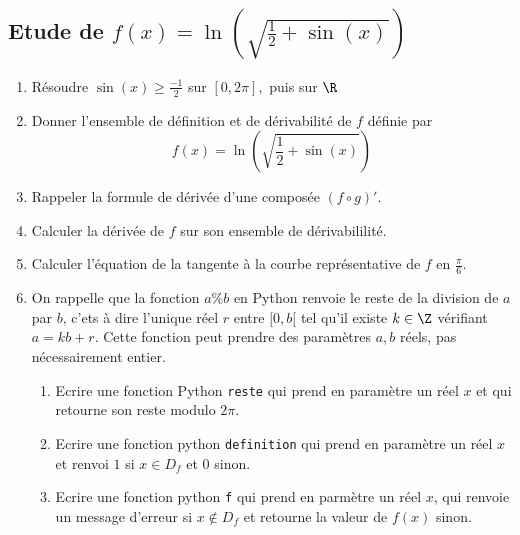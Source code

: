 \subsection{Etude de $ f(x) = \ln\left(\sqrt{\frac{1}{2}+ \sin(x)}\right)$}
\begin{exercice}
\begin{enumerate}
\item Résoudre $\sin(x) \geq \frac{-1}{2} $ sur $[0,2\pi],$ puis sur $\R$
\item Donner l'ensemble de définition et de dérivabilité de $f$ définie par 
$$ f(x) = \ln\left(\sqrt{\frac{1}{2}+ \sin(x)}\right)$$
\item Rappeler la formule de dérivée d'une composée $(f\circ g) '$. 
\item Calculer la dérivée de $f$ sur son ensemble de dérivabililité. 
\item Calculer l'équation de la tangente à la courbe représentative de $f$ en $\frac{\pi}{6}$. 
\item On rappelle que la fonction $a\% b$ en Python renvoie le reste de la division de $a$ par $b$, c'ets à dire l'unique réel $r$ entre $[0,b[$ tel qu'il existe $k\in \Z$ vérifiant $a= kb+r$. Cette fonction  peut prendre des paramètres $a,b$ réels, pas nécessairement entier. 
\begin{enumerate}
\item Ecrire une fonction Python \texttt{reste} qui prend en paramètre un réel $x$ et qui retourne son reste modulo $2\pi$. 
\item Ecrire une fonction python  \texttt{definition} qui prend en paramètre un réel $x$ et renvoi $1$ si $x\in D_f$ et $0$ sinon. 
\item Ecrire une fonction python \texttt{f} qui prend en parmètre un réel $x$, qui renvoie un message d'erreur si $x\notin D_f$ et retourne la valeur de $f(x)$ sinon.  
\end{enumerate}
\end{enumerate}

\end{exercice}
